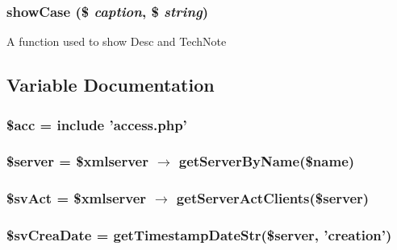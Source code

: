 \subsubsection{\setlength{\rightskip}{0pt plus 5cm}show\-Case (\$ {\em caption}, \$ {\em string})}\label{serverdetails_8php_c6c2ceaef7d07aba55c9e9af3141a7ad}


A function used to show Desc and Tech\-Note 

\subsection{Variable Documentation}
\subsubsection{\setlength{\rightskip}{0pt plus 5cm}\$acc = include 'access.php'}\label{serverdetails_8php_542926c588a05eb69553d79c83cf73da}


\subsubsection{\setlength{\rightskip}{0pt plus 5cm}\$server = \$xmlserver $\rightarrow$ get\-Server\-By\-Name(\$name)}\label{serverdetails_8php_d135cc8a47e55f0829949cf62214170f}


\subsubsection{\setlength{\rightskip}{0pt plus 5cm}\$sv\-Act = \$xmlserver $\rightarrow$ get\-Server\-Act\-Clients(\$server)}\label{serverdetails_8php_2f838ddac7291ef340615706fc9c560a}


\subsubsection{\setlength{\rightskip}{0pt plus 5cm}\$sv\-Crea\-Date = get\-Timestamp\-Date\-Str(\$server, 'creation')}\label{serverdetails_8php_5d6347617c4eb8211ab49f474c7c26d1}


